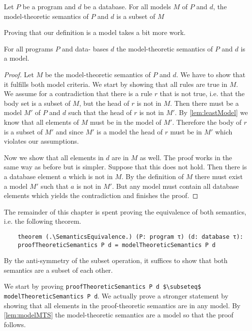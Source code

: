 \begin{lemma}[\leastModel]\label{lem:leastModel}
    Let $P$ be a program and $d$ be a database. For all models $M$ of $P$ and $d$, the model-theoretic semantics of $P$ and $d$ is a subset of $M$
\end{lemma}

Proving that our definition is a model takes a bit more work.

\begin{lemma}[\modelTheoreticSemanticsIsModel]\label{lem:modelMTS}
    For all programs $P$ and data- bases $d$ the model-theoretic semantics of $P$ and $d$ is a model.
\end{lemma}
\begin{proof}
    Let $M$ be the model-theoretic semantics of $P$ and $d$. We have to show that it fulfills both model criteria.
    We start by showing that all rules are true in $M$. We assume for a contradiction that there is a rule $r$ that is not true, i.e. that the body set is a subset of $M$, but the head of $r$ is not in $M$. Then there must be a model $M'$ of $P$ and $d$ such that the head of $r$ is not in $M'$. By \cref{lem:leastModel} we know that all elements of $M$ must be in the model of $M'$. Therefore the body of $r$ is a subset of $M'$ and since $M'$ is a model the head of $r$ must be in $M'$ which violates our assumptions.

    Now we show that all elements in $d$ are in $M$ as well. The proof works in the same way as before but is simpler. Suppose that this does not hold. Then there is a database element $a$ which is not in $M$. By the definition of $M$ there must exist a model $M'$ such that $a$ is not in $M'$. But any model must contain all database elements which yields the contradiction and finishes the proof.
\end{proof}

The remainder of this chapter is spent proving the equivalence of both semantics, i.e. the following theorem.

\begin{lstlisting}
    theorem (.\SemanticsEquivalence.) (P: program τ) (d: database τ): 
    proofTheoreticSemantics P d = modelTheoreticSemantics P d
\end{lstlisting}

By the anti-symmetry of the subset operation, it suffices to show that both semantics are a subset of each other.

We start by proving \lstinline|proofTheoreticSemantics P d $\subseteq$ modelTheoreticSemantics P d|. We actually prove a stronger statement by showing that all elements in the proof-theoretic semantics are in any model. By \cref{lem:modelMTS} the model-theoretic semantics are a model so that the proof follows.

